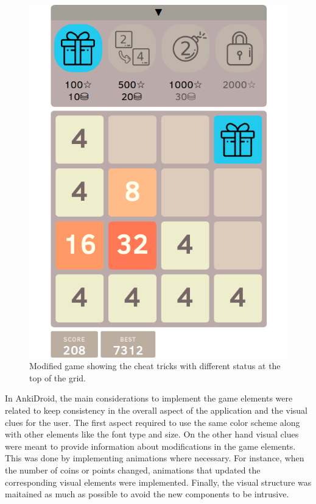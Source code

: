 \begin{figure}[htb]
    \vskip 5mm
        \begin{center}
            \includegraphics[scale=0.4]{./Figures/modified_game.png}
            \caption{Modified game showing the cheat tricks with different status at the top of the grid.}
            \label{fig:modified-game}
        \end{center}
    \vskip -5mm
\end{figure}

In AnkiDroid, the main considerations to implement the game elements were related to keep consistency in the overall aspect of the application and the visual clues for the user. The first aspect required to use the same color scheme along with other elements like the font type and size. On the other hand visual clues were meant to provide information about modifications in the game elements. This was done by implementing animations where necessary. For instance, when the number of coins or points changed, animations that updated the corresponding visual elements were implemented. Finally, the visual structure was maitained as much as possible to avoid the new components to be intrusive.



